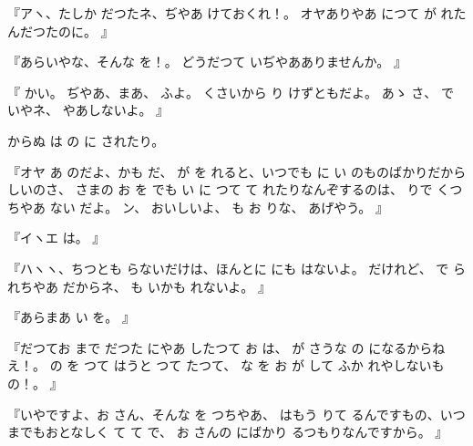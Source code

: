 『アヽ、たしか
だつたネ、ぢやあ
けておくれ！。
オヤありやあ
につて
が
れたんだつたのに。
』

『あらいやな、そんな
を！。
どうだつて
いぢやあありませんか。
』

『
かい。
ぢやあ、まあ、
ふよ。
くさいから
り
けずともだよ。
あゝ
さ、
で
いやネ、
やあしないよ。
』

からぬ
は
の
に
されたり。

『オヤ
あ
のだよ、かも
だ、
が
を
れると、いつでも
に
い
のものばかりだから
しいのさ、
さまの
お
を
でも
い
に
つて
て
れたりなんぞするのは、
りで
くつちやあ
ない
だよ。
ン、
おいしいよ、
も
お
りな、
あげやう。
』

『イヽエ
は。
』

『ハヽヽ、ちつとも
らないだけは、ほんとに
にも
はないよ。
だけれど、
で
られちやあ
だからネ、
も
いかも
れないよ。
』

『あらまあ
い
を。
』

『だつてお
まで
だつた
にやあ
したつて
お
は、
が
さうな
の
になるからねえ！。
の
を
つて
はうと
つて
たつて、
な
を
お
が
して
ふか
れやしないもの！。
』

『いやですよ、お
さん、そんな
を
つちやあ、
はもう
りて
るんですもの、いつまでもおとなしく
て
て
で、
お
さんの
にばかり
るつもりなんですから。
』

